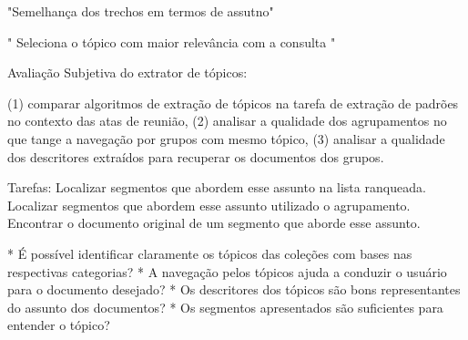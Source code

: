 
"Semelhança dos trechos em termos de assutno"

" Seleciona o tópico com maior relevância com a consulta "












Avaliação Subjetiva do extrator de tópicos:

(1) comparar algoritmos de extração de tópicos na tarefa de extração de padrões no contexto das atas de reunião, (2) analisar a qualidade dos agrupamentos no que tange a navegação por grupos com mesmo tópico, (3) analisar a qualidade dos descritores extraídos para recuperar os documentos dos grupos.


Tarefas:
Localizar segmentos que abordem esse assunto na lista ranqueada.
Localizar segmentos que abordem esse assunto utilizado o agrupamento.
Encontrar o documento original de um segmento que aborde esse assunto.

* É possível identificar claramente os tópicos das coleções com bases nas respectivas categorias?
* A navegação pelos tópicos ajuda a conduzir o usuário para o documento desejado?
* Os descritores dos tópicos são bons representantes do assunto dos documentos?
* Os segmentos apresentados são suficientes para entender o tópico?



